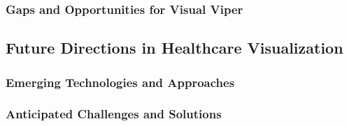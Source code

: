\subsubsection{Gaps and Opportunities for Visual Viper}\label{gaps-and-opportunities-for-visual-viper}

\subsection{Future Directions in Healthcare Visualization}\label{future-directions-in-healthcare-visualization}
\subsubsection{Emerging Technologies and Approaches}\label{emerging-technologies-and-approaches}
\subsubsection{Anticipated Challenges and Solutions}\label{anticipated-challenges-and-solutions}
